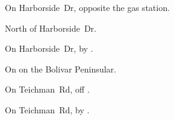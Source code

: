 
\begin{LocationList}

On  Harborside~Dr, opposite the gas station.

North of  Harborside~Dr.

\Location{\GasStation \Gas \Rest}
On  Harborside~Dr, by  .

On  on the Bolivar Peninsular.

On Teichman~Rd, off  .

\Location{\TruckService \Service}
On Teichman~Rd, by  .

\end{LocationList}
